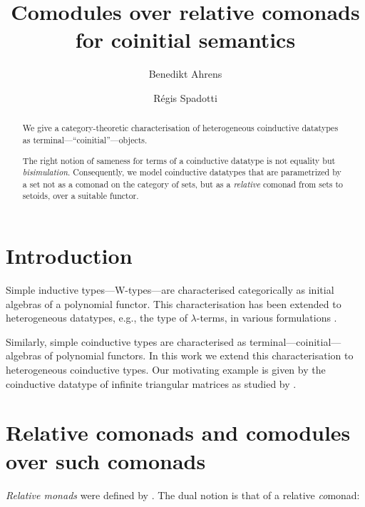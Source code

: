 \documentclass{amsart}
\author{Benedikt Ahrens}
\author{R\'egis Spadotti}
\title[Comodules over relative comonads for coinitial semantics]{Comodules over relative comonads \\ for coinitial semantics}
\begin{document}
\begin{abstract}
  We give a category-theoretic characterisation of heterogeneous coinductive datatypes as terminal---\enquote{coinitial}---objects.
  
  The right notion of sameness for terms of a coinductive datatype is not equality but \emph{bisimulation}.
  Consequently, we model coinductive datatypes that are parametrized by a set not as a comonad on the category of sets,
  but as a \emph{relative} comonad from sets to setoids, over a suitable functor.
\end{abstract}

\maketitle


\section{Introduction}

 Simple inductive types---\textsf{W}-types---are characterised categorically as initial algebras of
 a polynomial functor.
 This characterisation has been extended to heterogeneous datatypes, e.g., the type of $\lambda$-terms,
 in various formulations \parencite{fpt, ahrens_relmonads}.
 
 Similarly, simple coinductive types are characterised as terminal---coinitial---algebras of polynomial functors.
 In this work we extend this characterisation to heterogeneous coinductive types.
 Our motivating example is given by the coinductive datatype of infinite triangular matrices as studied by
 \textcite{DBLP:conf/types/MatthesP11}.


\section{Relative comonads and comodules over such comonads}

\emph{Relative monads} were defined by \textcite{DBLP:conf/fossacs/AltenkirchCU10}.
The dual notion is that of a relative \emph{co}monad:
\end{document}
